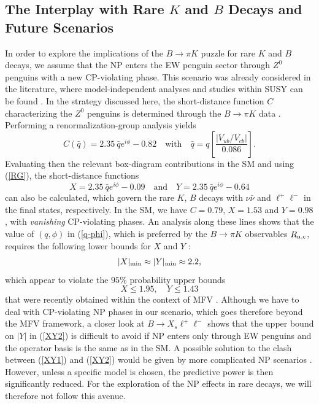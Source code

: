 \documentclass[11pt]{cernrep}
\begin{document}
\subsection{The Interplay with Rare $K$ and $B$ Decays and
Future Scenarios}\label{ssec:rareKB}
\unboldmath
%
%
%
In order to explore the implications of the $B\to\pi K$ puzzle for rare 
$K$ and $B$ decays, we
assume that the NP enters the EW penguin sector through 
$Z^0$ penguins with a new CP-violating phase. This scenario was already
considered in the literature, where model-independent analyses and 
studies within SUSY can be found \cite{Z-pen-analyses,BuHi}.
In the strategy discussed here, the short-distance function $C$ characterizing 
the $Z^0$ penguins is determined through the $B\to\pi K$ data \cite{BFRS-I}. 
Performing a renormalization-group analysis yields
\begin{equation}\label{RG}
C(\bar q)= 2.35~ \bar q e^{i\phi} -0.82 \quad\mbox{with}\quad 
\bar q= q \left[\frac{|V_{ub}/V_{cb}|}{0.086}\right].
\end{equation}
Evaluating then the relevant box-diagram contributions in the SM 
and using (\ref{RG}), the short-distance functions
\begin{equation}\label{X-C-rel}
X=2.35~ \bar q e^{i\phi} -0.09 \quad \mbox{and} \quad 
Y=2.35~ \bar q e^{i\phi} -0.64
\end{equation}
can also be calculated, which govern the rare $K$, $B$ decays with $\nu\bar\nu$ 
and $\ell^+\ell^-$ in the final states, respectively. In the SM, we have 
$C=0.79$, $X=1.53$ and $Y=0.98$, with {\it vanishing} CP-violating phases. 
An analysis along these lines shows that the value of $(q,\phi)$ in (\ref{q-phi}), 
which is preferred by the $B\to\pi K$ observables $R_{\rm n,c}$, requires the 
following lower bounds for $X$ and $Y$ \cite{BFRS-5}:
\begin{equation}\label{XY1}
|X|_{\rm min}\approx 
|Y|_{\rm min}\approx 2.2,
\end{equation}
which appear to violate the $95\%$ probability upper bounds
\begin{equation}\label{XY2}
X\le 1.95, \quad Y\le 1.43
\end{equation}
that were recently obtained within the context of MFV \cite{Bobeth:2005ck}. 
Although we have to deal with CP-violating NP phases in our scenario,
which goes therefore beyond the MFV framework, a closer look at 
$B\to X_s \ell^+\ell^-$ shows that the upper 
bound on $|Y|$ in (\ref{XY2}) is difficult to avoid if NP enters only through
EW penguins  and the operator basis is the same as in the SM. A possible
solution to the clash between (\ref{XY1}) and (\ref{XY2}) would be given
by more complicated NP scenarios \cite{BFRS-5}. However, unless a specific 
model is chosen, the predictive power is then significantly reduced. For the
exploration of the NP effects in rare decays, we will therefore not follow
this avenue. 
\end{document}
